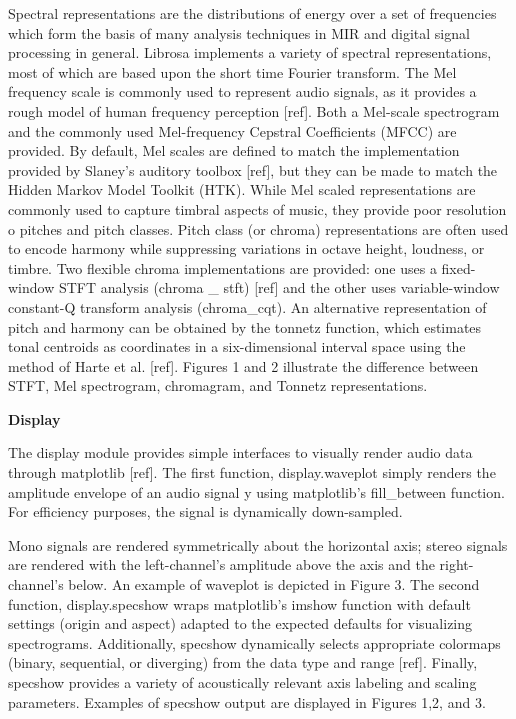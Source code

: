 Spectral representations are the distributions of energy over a set of frequencies which form the basis of many analysis techniques in MIR and digital signal processing in general. Librosa implements a variety of spectral representations, most of which are based upon the short \space time Fourier transform. The Mel frequency scale is commonly used to represent audio signals, as it provides a rough model of human frequency perception [ref]. Both a Mel-scale spectrogram and the commonly used Mel-frequency Cepstral Coefficients (MFCC) are provided. By default, Mel scales are defined to match the implementation provided by Slaney’s auditory toolbox [ref], but they can be made to match the Hidden Markov Model Toolkit (HTK). While Mel \space scaled representations are commonly used to capture timbral aspects of music, they provide poor resolution o pitches and pitch classes. Pitch class (or chroma) representations are often used to encode harmony while suppressing variations in octave height, loudness, or timbre. Two flexible chroma implementations are provided: one uses a fixed-window STFT analysis (chroma \_ stft) [ref] and the other uses variable-window constant-Q transform analysis (chroma\_cqt). An alternative representation of pitch and harmony can be obtained by the tonnetz function, which estimates tonal centroids as coordinates in a six-dimensional interval space using the method of Harte et \space al. [ref]. Figures 1 and 2 illustrate the difference between STFT, Mel spectrogram, chromagram, and Tonnetz representations.

\begin{flushleft}
  \textbf{Display}
\end{flushleft}

The display module provides simple interfaces to visually render audio data through matplotlib [ref]. The first function, display.waveplot simply renders the amplitude envelope of an audio signal y using matplotlib’s fill\_between function. For efficiency purposes, the signal is dynamically down-sampled.
\par
Mono signals are rendered symmetrically about the horizontal axis; stereo signals are rendered with the left-channel’s amplitude above the axis and the right-channel’s below. An example of waveplot is depicted in Figure 3. The second function, display.specshow wraps matplotlib’s imshow function with default settings (origin and aspect) adapted to the expected defaults for visualizing spectrograms. Additionally, specshow dynamically selects appropriate colormaps (binary, sequential, or diverging) from the data type and range [ref]. Finally, specshow provides a variety of acoustically relevant axis labeling and scaling parameters. Examples of specshow output are displayed in Figures 1,2, and 3.

